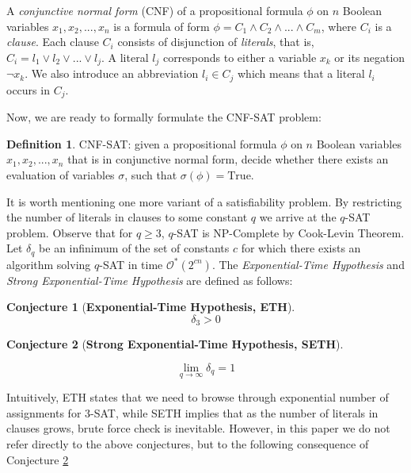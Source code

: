 \documentclass[en]{pracamgr}
\newtheorem{conjecture}{Conjecture}
\theoremstyle{definition}
\newtheorem{definition}{Definition}
\newcommand{\cnfsat}{{\sc CNF-SAT}}
\newcommand{\true}{\textrm{True}}
\begin{document}
A \textit{conjunctive normal form} (CNF) of a propositional formula $\phi$ on $n$ Boolean variables $x_1,x_2,...,x_n$ is a formula of form $\phi=C_1 \land C_2 \land ... \land C_m$, where $C_i$ is a \textit{clause}. Each clause $C_i$ consists of disjunction of \textit{literals}, that is, $C_i=l_1 \lor l_2 \lor ... \lor l_j$. A literal $l_j$ corresponds to either a variable $x_k$ or its negation $\neg x_k$. We also introduce an abbreviation $l_i \in C_j$ which means that a literal $l_i$ occurs in $C_j$.

Now, we are ready to formally formulate the \cnfsat{} problem:

\begin{definition}
	\cnfsat{}: given a propositional formula $\phi$ on $n$ Boolean variables $x_1,x_2,...,x_n$ that is in conjunctive normal form, decide whether there exists an evaluation of variables $\sigma$, such that $\sigma(\phi)=\true$.
\end{definition}

It is worth mentioning one more variant of a satisfiability problem. By restricting the number of literals in clauses to some constant $q$ we arrive at the $q$-{\sc SAT} problem. Observe that for $q \geq 3$, $q$-{\sc SAT} is NP-Complete by Cook-Levin Theorem. Let $\delta_q$ be an infinimum of the set of constants $c$ for which there exists an algorithm solving $q$-{\sc SAT} in time $\mathcal{O}^*(2^{cn})$. The \textit{Exponential-Time Hypothesis} and \textit{Strong Exponential-Time Hypothesis} are defined as follows:

\begin{conjecture}[\textbf{Exponential-Time Hypothesis, ETH}]

\begin{equation*}
	\delta_3 > 0
\end{equation*}
\end{conjecture}

\begin{conjecture}[\textbf{Strong Exponential-Time Hypothesis, SETH}]\label{SETH}
	
	\begin{equation*}
	\lim\limits_{q \rightarrow \infty}\delta_q = 1
	\end{equation*}
\end{conjecture}

Intuitively, ETH states that we need to browse through exponential number of assignments for $3$-{\sc SAT}, while SETH implies that as the number of literals in clauses grows, brute force check is inevitable. However, in this paper we do not refer directly to the above conjectures, but to the following consequence of Conjecture \ref{SETH}
\end{document}
